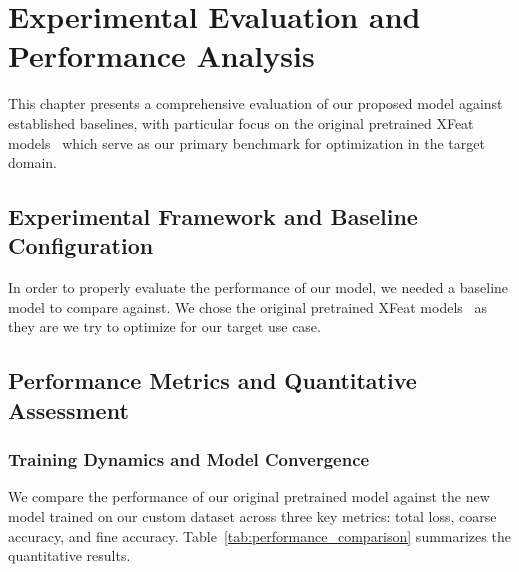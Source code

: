 \chapter{Experimental Evaluation and Performance Analysis}

This chapter presents a comprehensive evaluation of our proposed model against
established baselines, with particular focus on the original pretrained XFeat
models~\cite{x_feat_official_github} which serve as our primary benchmark for
optimization in the target domain.

\section{Experimental Framework and Baseline Configuration}

In order to properly evaluate the performance of our model, we needed a
baseline model to compare against. We chose the original pretrained XFeat
models~\cite{x_feat_official_github} as they are we try to optimize for our target use
case.

\section{Performance Metrics and Quantitative Assessment}

\subsection{Training Dynamics and Model Convergence}

We compare the performance of our original pretrained model against the new
model trained on our custom dataset across three key metrics: total loss,
coarse accuracy, and fine accuracy. Table~\ref{tab:performance_comparison}
summarizes the quantitative results.

